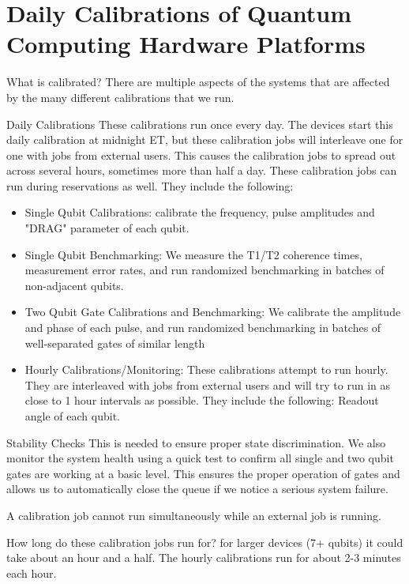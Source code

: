 
\Appendix

\section{Daily Calibrations of Quantum Computing Hardware Platforms}

What is calibrated?
There are multiple aspects of the systems that are affected by the many different calibrations that we run.

Daily Calibrations
These calibrations run once every day. The devices start this daily calibration at midnight ET, but these calibration jobs will interleave one for one with jobs from external users. This causes the calibration jobs to spread out across several hours, sometimes more than half a day. These calibration jobs can run during reservations as well. They include the following:
\begin{itemize}
    \item Single Qubit Calibrations: calibrate the frequency, pulse amplitudes and "DRAG" parameter of each qubit.
    \item Single Qubit Benchmarking: We measure the T1/T2 coherence times, measurement error rates, and run randomized benchmarking in batches of non-adjacent qubits. 
    \item Two Qubit Gate Calibrations and Benchmarking: We calibrate the amplitude and phase of each pulse, and run randomized benchmarking in batches of well-separated gates of similar length
    \item Hourly Calibrations/Monitoring:  These calibrations attempt to run hourly. They are interleaved with jobs from external users and will try to run in as close to 1 hour intervals as possible. They include the following:
Readout angle of each qubit.
\end{itemize}







Stability Checks
This is needed to ensure proper state discrimination.
We also monitor the system health using a quick test to confirm all single and two qubit gates are working at a basic level. This ensures the proper operation of gates and allows us to automatically close the queue if we notice a serious system failure.

 A calibration job cannot run simultaneously while an external job is running.

How long do these calibration jobs run for?
for larger devices (7+ qubits) it could take about an hour and a half. The hourly calibrations run for about 2-3 minutes each hour.

